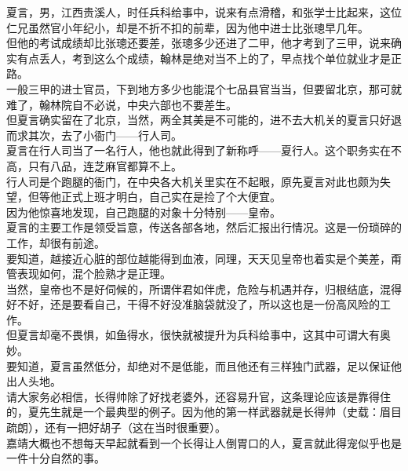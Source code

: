 \begin{multicols}{\theparacolNo}
夏言，男，江西贵溪人，时任兵科给事中，说来有点滑稽，和张学士比起来，这位仁兄虽然官小年纪小，却是不折不扣的前辈，因为他中进士比张璁早几年。\\

但他的考试成绩却比张璁还要差，张璁多少还进了二甲，他才考到了三甲，说来确实有点丢人，考到这么个成绩，翰林是绝对当不上的了，早点找个单位就业才是正路。\\

一般三甲的进士官员，下到地方多少也能混个七品县官当当，但要留北京，那可就难了，翰林院自不必说，中央六部也不要差生。\\

但夏言确实留在了北京，当然，两全其美是不可能的，进不去大机关的夏言只好退而求其次，去了小衙门——行人司。\\

夏言在行人司当了一名行人，他也就此得到了新称呼——夏行人。这个职务实在不高，只有八品，连芝麻官都算不上。\\

行人司是个跑腿的衙门，在中央各大机关里实在不起眼，原先夏言对此也颇为失望，但等他正式上班才明白，自己实在是捡了个大便宜。\\

因为他惊喜地发现，自己跑腿的对象十分特别——皇帝。\\

夏言的主要工作是领受旨意，传送各部各地，然后汇报出行情况。这是一份琐碎的工作，却很有前途。\\

要知道，越接近心脏的部位越能得到血液，同理，天天见皇帝也着实是个美差，甭管表现如何，混个脸熟才是正理。\\

当然，皇帝也不是好伺候的，所谓伴君如伴虎，危险与机遇并存，归根结底，混得好不好，还是要看自己，干得不好没准脑袋就没了，所以这也是一份高风险的工作。\\

但夏言却毫不畏惧，如鱼得水，很快就被提升为兵科给事中，这其中可谓大有奥妙。\\

要知道，夏言虽然低分，却绝对不是低能，而且他还有三样独门武器，足以保证他出人头地。\\

请大家务必相信，长得帅除了好找老婆外，还容易升官，这条理论应该是靠得住的，夏先生就是一个最典型的例子。因为他的第一样武器就是长得帅（史载：眉目疏朗），还有一把好胡子（这在当时很重要）。\\

嘉靖大概也不想每天早起就看到一个长得让人倒胃口的人，夏言就此得宠似乎也是一件十分自然的事。\\


\end{multicols}
